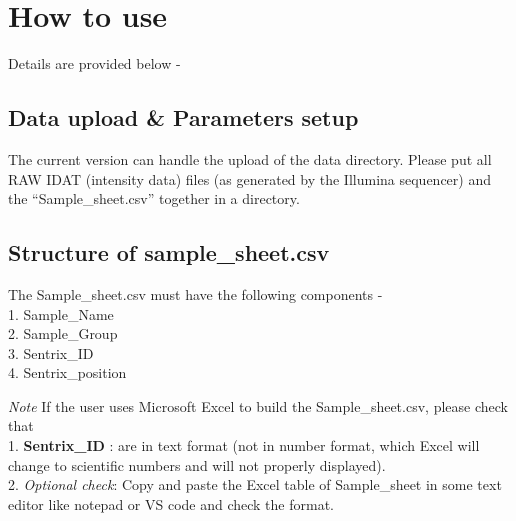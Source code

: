 \documentclass[
  a4paper,
  DIV=11,
  numbers=noendperiod,
  oneside,
  open=any]{scrreport}
\begin{document}
\section{How to use}\label{how-to-use-1}

Details are provided below -

\subsection{Data upload \& Parameters
setup}\label{data-upload-parameters-setup}

The current version can handle the upload of the data directory. Please
put all RAW IDAT (intensity data) files (as generated by the Illumina
sequencer) and the ``Sample\_sheet.csv'' together in a directory.

\subsection{Structure of
sample\_sheet.csv}\label{structure-of-sample_sheet.csv}

The Sample\_sheet.csv must have the following components -\\
1. Sample\_Name\\
2. Sample\_Group\\
3. Sentrix\_ID\\
4. Sentrix\_position

\begin{tcolorbox}[enhanced jigsaw, opacityback=0, toprule=.15mm, bottomtitle=1mm, colback=white, rightrule=.15mm, breakable, coltitle=black, colbacktitle=quarto-callout-warning-color!10!white, toptitle=1mm, arc=.35mm, colframe=quarto-callout-warning-color-frame, bottomrule=.15mm, opacitybacktitle=0.6, titlerule=0mm, leftrule=.75mm, title=\textcolor{quarto-callout-warning-color}{\faExclamationTriangle}\hspace{0.5em}{Warning}, left=2mm]

\emph{Note} If the user uses Microsoft Excel to build the
Sample\_sheet.csv, please check that\\
1. \textbf{Sentrix\_ID} : are in text format (not in number format,
which Excel will change to scientific numbers and will not properly
displayed).\\
2. \emph{Optional check}: Copy and paste the Excel table of
Sample\_sheet in some text editor like notepad or VS code and check the
format.

\end{tcolorbox}
\end{document}
